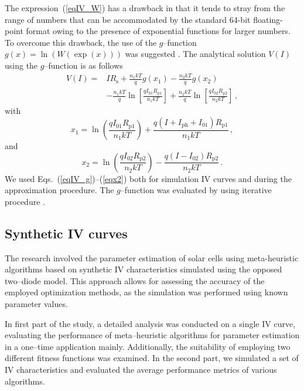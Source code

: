 \documentclass[a4paper,fleqn]{cas-dc}
\begin{document}
The expression~(\ref{eqIV_W}) has a drawback in that it tends to stray from the range of numbers that can be accommodated by the standard 64-bit floating-point format owing to the presence of exponential functions for larger numbers.
To overcome this drawback, the use of the $g$--function $g(x)=\ln(W(\exp(x)))$ was suggested \cite{roberts2015calculating}.
The analytical solution $V(I)$ using the $g$--function is as follows \cite{roberts2015calculating}
\begin{equation}
\label{eqIV_g}
\begin{split}
V(I)= &IR_\mathrm{s}+\frac{n_1kT}{q}g(x_1)-\frac{n_2kT}{q}g(x_2) \\
  &-\frac{n_1kT}{q}\ln\left[\frac{qI_{01}R_\mathrm{p1}}{n_1kT}\right] +\frac{n_2kT}{q}\ln\left[\frac{qI_{02}R_\mathrm{p2}}{n_2kT}\right]\,,
\end{split}
\end{equation}
with
\begin{equation}
\label{eqx1}
x_1= \ln\left(\frac{qI_{01}R_\mathrm{p1}}{n_1kT}\right)+\frac{q(I+I_\mathrm{ph}+I_{01})R_\mathrm{p1}}{n_1kT}\,,
\end{equation}
and
\begin{equation}
\label{eqx2}
x_2= \ln\left(\frac{qI_{02}R_\mathrm{p2}}{n_2kT}\right)-\frac{q(I-I_{02})R_\mathrm{p2}}{n_2kT}\,.
\end{equation}
We used Eqs.~(\ref{eqIV_g})--(\ref{eqx2}) both for simulation IV curves and during the approximation procedure.
The $g$--function was evaluated by using iterative procedure \cite{roberts2015calculating}.

\subsection{Synthetic IV curves}\label{SynIV}
The research involved the parameter estimation of solar cells using meta-heuristic algorithms based
on synthetic IV characteristics simulated using the opposed two--diode model.
This approach allows for assessing the accuracy of the employed optimization methods,
as the simulation was performed using known parameter values.

In first part of the study, a detailed analysis was conducted on a single IV curve,
evaluating the performance of meta--heuristic algorithms for parameter estimation in a one--time application mainly.
Additionally, the suitability of employing two different fitness functions was examined.
In the second part, we simulated a set of IV characteristics and evaluated the average performance metrics of various algorithms.
\end{document}
